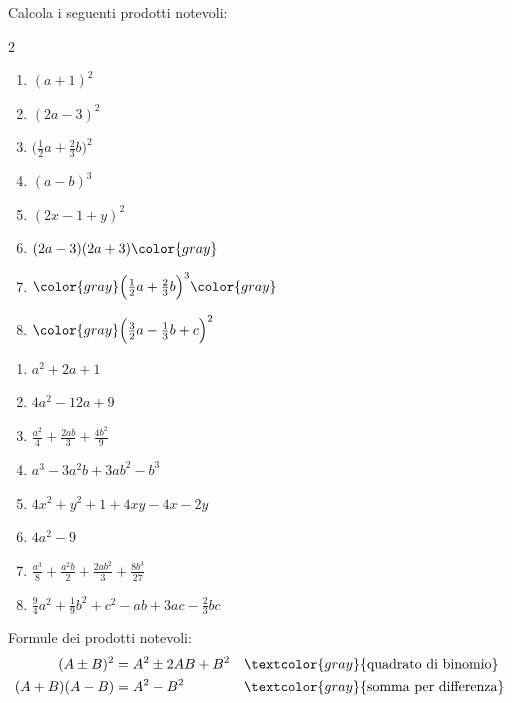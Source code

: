 \begin{question}[ID=2.1, subtitle={Prodotti notevoli — serie 1}, tags={prodotti notevoli, polinomi}, difficulty=facile]
Calcola i seguenti prodotti notevoli:
\begin{center}\begin{minipage}{0.92\linewidth}
\begin{multicols}{2}
\begin{enumerate}[leftmargin=3.2cm]
\item $(a+1)^2$
\item $(2a -3)^2$
\item $\Big(\frac{1}{2}a+\frac{2}{3}b\Big)^2$
\item $(a-b)^3$
\item $(2x - 1 + y)^2$
\item $(2a -3)(2a +3) \color{gray}$
\item $\color{gray} \Big(\frac{1}{2}a+\frac{2}{3}b\Big)^3 \color{gray}$
\item $\color{gray} \Big(\frac{3}{2}a-\frac{1}{3}b + c\Big)^2$
\end{enumerate}
\end{multicols}
\end{minipage}\end{center}
\begin{solution}
\begin{enumerate}
    \item $a^2+2a+1$
    \item $4a^2-12a+9$
    \item $\tfrac{a^2}{4}+\tfrac{2ab}{3}+\tfrac{4b^2}{9}$
    \item $a^3-3a^2b+3ab^2-b^3$
    \item $4x^2+y^2+1+4xy-4x-2y$
    \item $4a^2-9$
    \item $\tfrac{a^3}{8}+\tfrac{a^2b}{2}+\tfrac{2ab^2}{3}+\tfrac{8b^3}{27}$
    \item $\tfrac94a^2+\tfrac19b^2+c^2-ab+3ac-\tfrac23bc$
\end{enumerate}
\end{solution}
\begin{explanation}
Formule dei prodotti notevoli:
\[\begin{aligned}
(A\pm B)^2 &= A^2\pm2AB+B^2 && \textcolor{gray}{\text{quadrato di binomio}}\\
(A+B)(A-B) &= A^2-B^2 && \textcolor{gray}{\text{somma per differenza}}\\

\end{aligned}\]
\end{explanation}
\end{question}
